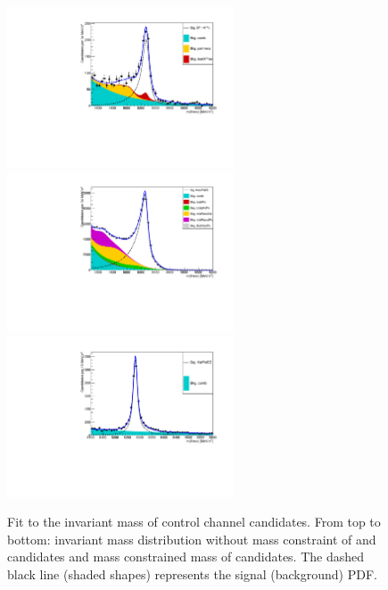 %
\begin{figure}[h!]
\centering
\includegraphics[width=0.6\textwidth]{RKst/figs/Fit/fit_EE/fit_G.pdf}
\includegraphics[width=0.6\textwidth]{RKst/figs/Fit/fit_EE/fit_JPs.pdf}
\includegraphics[width=0.6\textwidth]{RKst/figs/Fit/fit_EE/fit_Psi.pdf}
\caption{Fit to the \mKpiee invariant mass of control channel candidates.
From top to bottom: invariant mass distribution without mass constraint of \BdToKstGee
and \BdToKstJPsee candidates and mass constrained mass of \BdToKstPsiee candidates.
The dashed black line (shaded shapes) represents the signal (background) PDF.}
\label{fig:fitsControlEE}
\end{figure}

\clearpage

